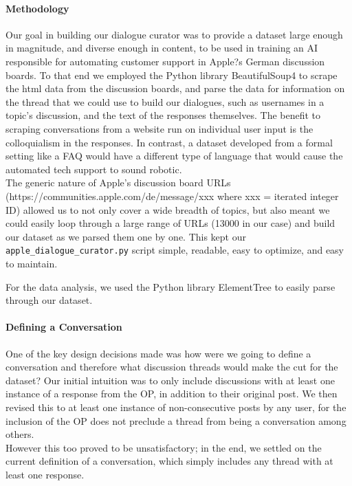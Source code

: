 \documentclass[10pt]{article}
\begin{document}
\begin{multicols}{2}
\paragraph{Methodology}
Our goal in building our dialogue curator was to provide a dataset large enough in magnitude, and diverse enough in content, to be used in training an AI responsible for automating customer support in Apple?s German discussion boards. To that end we employed the Python library BeautifulSoup4 to scrape the html data from the discussion boards, and parse the data for information on the thread that we could use to build our dialogues, such as usernames in a topic's discussion, and the text of the responses themselves. The benefit to scraping conversations from a website run on individual user input is the colloquialism in the responses. In contrast, a dataset developed from a formal setting like a FAQ would have a different type of language that would cause the automated tech support to sound robotic.\\

The generic nature of Apple's discussion board URLs (https://communities.apple.com/de/message/xxx where xxx = iterated integer ID) allowed us to not only cover a wide breadth of topics, but also meant we could easily loop through a large range of URLs (13000 in our case) and build our dataset as we parsed them one by one. This kept our \texttt{apple\_dialogue\_curator.py} script simple, readable, easy to optimize, and easy to maintain.

For the data analysis, we used the Python library ElementTree to easily parse through our dataset.

\paragraph{Defining a Conversation}
One of the key design decisions made was how were we going to define a conversation and therefore what discussion threads would make the cut for the dataset? Our initial intuition was to only include discussions with at least one instance of a response from the OP, in addition to their original post. We then revised this to at least one instance of non-consecutive posts by any user, for the inclusion of the OP does not preclude a thread from being a conversation among others.\\

However this too proved to be unsatisfactory; in the end, we settled on the current definition of a conversation, which simply includes any thread with at least one response.\\


\end{multicols}
\end{document}
